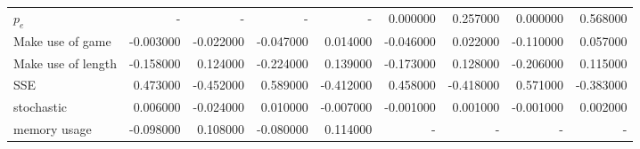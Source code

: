 \begin{tabular}{lrrrrrrrr}
$p_e$ & - & - & - & - & 0.000000 & 0.257000 & 0.000000 & 0.568000 \\
Make use of game & -0.003000 & -0.022000 & -0.047000 & 0.014000 & -0.046000 & 0.022000 & -0.110000 & 0.057000 \\
Make use of length & -0.158000 & 0.124000 & -0.224000 & 0.139000 & -0.173000 & 0.128000 & -0.206000 & 0.115000 \\
SSE & 0.473000 & -0.452000 & 0.589000 & -0.412000 & 0.458000 & -0.418000 & 0.571000 & -0.383000 \\
stochastic & 0.006000 & -0.024000 & 0.010000 & -0.007000 & -0.001000 & 0.001000 & -0.001000 & 0.002000 \\
memory usage & -0.098000 & 0.108000 & -0.080000 & 0.114000 & - & - & - & - \\
\end{tabular}
